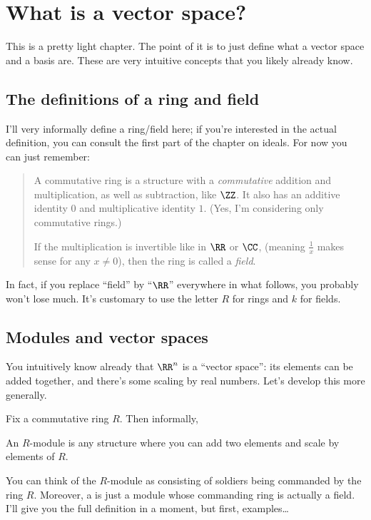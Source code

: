 \chapter{What is a vector space?}
This is a pretty light chapter.
The point of it is to just define what a vector space and a basis are.
These are very intuitive concepts that you likely already know.

\section{The definitions of a ring and field}
I'll very informally define a ring/field here; if you're interested in the actual definition,
you can consult the first part of the chapter on ideals.
For now you can just remember:
\begin{quote}
	A commutative ring is a structure with a \emph{commutative}
	addition and multiplication, as well as subtraction, like $\ZZ$. 
	It also has an additive identity $0$ and multiplicative identity $1$.
	(Yes, I'm considering only commutative rings.)

	If the multiplication is invertible like in $\RR$ or $\CC$,
	(meaning $\frac 1x$ makes sense for any $x \neq 0$),
	then the ring is called a \emph{field}.
\end{quote}
In fact, if you replace ``field'' by ``$\RR$'' everywhere in what follows, you probably won't lose much.
It's customary to use the letter $R$ for rings and $k$ for fields.

\section{Modules and vector spaces}
You intuitively know already that $\RR^n$ is a ``vector space'':
its elements can be added together,
and there's some scaling by real numbers.
Let's develop this more generally.

Fix a commutative ring $R$.
Then informally,
\begin{moral}
	An $R$-module is any structure where you can add two elements
	and scale by elements of $R$.
\end{moral}
You can think of the $R$-module as consisting of soldiers
being commanded by the ring $R$.
Moreover, a  is just a module whose commanding ring
is actually a field.
I'll give you the full definition in a moment,
but first, examples\dots

